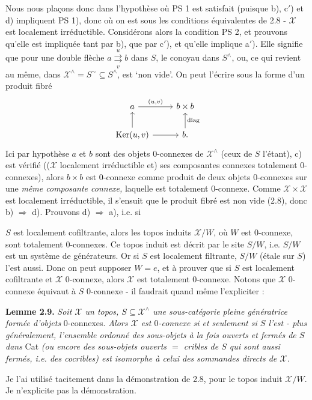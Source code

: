 \documentclass[11pt]{article}
\newcommand{\printedpage}[1]{\marginpar{\footnotesize p.~#1}}
\newcommand{\msp}[1]{\marginpar{\footnotesize [#1]}}
\newcommand{\X}{\mathcal{X}}
\begin{document}
\msp{page 24}Nous nous plaçons donc dans l'hypothèse où PS 1 est satisfait (puisque b), c$'$) et d) impliquent PS 1), donc où on est sous les conditions équivalentes de 2.8 - $\X$ est localement irréductible. Considérons alors la condition PS 2, et prouvons qu'elle est impliquée tant par b), que par c$'$), et qu'elle implique a$'$). Elle signifie que pour une double flèche $a\overset{u}{\underset{v}{\rightrightarrows}}b$ dans $S$, le conoyau dans $S^\wedge$, ou, ce qui revient au même, dans $\X^\wedge=S^\sim\subseteq S^\wedge$, est `non vide'. On peut l'écrire sous la forme d'un produit fibré
\[
\begin{tikzcd}
a \arrow[r, "{\scriptstyle (u,v)}"] & b\times b \\
\operatorname{Ker}(u,v) \arrow[u] \arrow[r] & b. \arrow[u, "\mathrm{diag}"']
\end{tikzcd}
\]
Ici par hypothèse $a$ et $b$ sont des objets 0-connexes de $\X^\wedge$ (ceux de $S$ l'étant), c) est vérifié (($\X$ localement irréductible et) ses composantes connexes totalement 0-connexes), alors $b\times b$ est 0-connexe comme produit de deux objets 0-connexes sur une \textit{même composante connexe,} laquelle est totalement 0-connexe. Comme $\X\times\X$ est localement irréductible, il s'ensuit que le produit fibré est non vide (2.8), donc b) $\Longrightarrow$ d). Prouvons d) $\Longrightarrow$ a), i.e. si

\msp{page 25}$S$ est localement cofiltrante, alors les topos induits $\X/W$, où $W$ est 0-connexe, sont totalement 0-connexes. Ce topos induit est décrit par le site $S/W$, i.e. $S/W$ est un système de générateurs. Or si $S$ est localement filtrante, $S/W$ (étale sur $S$) l'est aussi. Donc on peut supposer $W=e$, et à prouver que si $S$ est localement cofiltrante et $\X$ 0-connexe, alors $\X$ est totalement 0-connexe. Notons que $\X$ 0-connexe équivaut à $S$ 0-connexe - il faudrait quand même l'expliciter :

\textbf{Lemme 2.9.} \textit{Soit $\X$ un topos, $S\subseteq\X^\wedge$ une sous-catégorie pleine génératrice formée d'objets} 0-connexes. \textit{Alors $\X$ est $0$-connexe si et seulement si $S$ l'est - plus généralement, l'ensemble ordonné des sous-objets à la fois ouverts et fermés de $S$ dans} Cat \textit{(ou encore des
\printedpage{16}
sous-objets ouverts $=$ cribles de $S$ qui sont aussi fermés, i.e. des cocribles) est isomorphe à celui des sommandes directs de $\X$.}

Je l'ai utilisé tacitement dans la démonstration de 2.8, pour le topos induit $\X/W$. Je n'explicite pas la démonstration.
\end{document}
